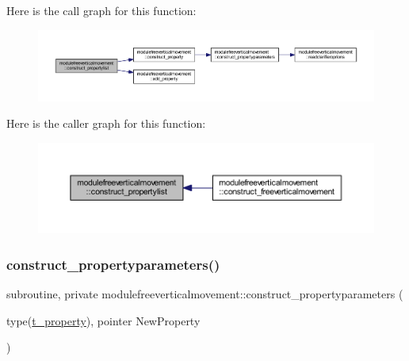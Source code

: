 Here is the call graph for this function\+:\nopagebreak
\begin{figure}[H]
\begin{center}
\leavevmode
\includegraphics[width=350pt]{namespacemodulefreeverticalmovement_a5ca7e73e0a11ea273e8a65cdd0734e44_cgraph}
\end{center}
\end{figure}
Here is the caller graph for this function\+:\nopagebreak
\begin{figure}[H]
\begin{center}
\leavevmode
\includegraphics[width=350pt]{namespacemodulefreeverticalmovement_a5ca7e73e0a11ea273e8a65cdd0734e44_icgraph}
\end{center}
\end{figure}
\mbox{\label{namespacemodulefreeverticalmovement_a5899cd9d999076fff990bfecf3b374a7}} 
\subsubsection{\texorpdfstring{construct\+\_\+propertyparameters()}{construct\_propertyparameters()}}
{\footnotesize\ttfamily subroutine, private modulefreeverticalmovement\+::construct\+\_\+propertyparameters (\begin{DoxyParamCaption}\item[{type(\mbox{\hyperlink{structmodulefreeverticalmovement_1_1t__property}{t\+\_\+property}}), pointer}]{New\+Property }\end{DoxyParamCaption})\hspace{0.3cm}{\ttfamily [private]}}

